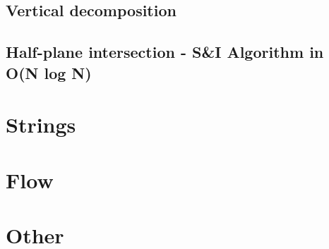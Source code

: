 \subsection{Vertical decomposition}
\subsection{Half-plane intersection - S&I Algorithm in O(N log N)}	

\section{Strings}

\section{Flow}

\section{Other}

